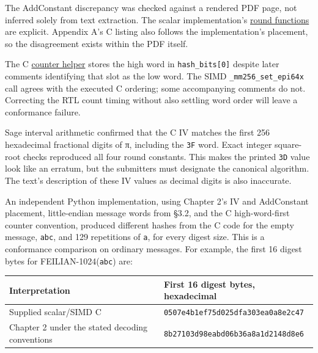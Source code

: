 \documentclass[
  english,
  11pt,
  a4paper,
]{article}
\newcounter{none} %
\begin{document}
The AddConstant discrepancy was checked against a rendered PDF page, not
inferred solely from text extraction. The scalar implementation's
\href{data/SOURCES.md\#source-7}{round functions} are explicit. Appendix
A's C listing also follows the implementation's placement, so the
disagreement exists within the PDF itself.

The C \href{data/SOURCES.md\#source-8}{counter helper} stores the high
word in \texttt{hash\_bits{[}0{]}} despite later comments identifying
that slot as the low word. The SIMD \texttt{\_mm256\_set\_epi64x} call
agrees with the executed C ordering; some accompanying comments do not.
Correcting the RTL count timing without also settling word order will
leave a conformance failure.

Sage interval arithmetic confirmed that the C IV matches the first 256
hexadecimal fractional digits of π, including the \texttt{3F} word.
Exact integer square-root checks reproduced all four round constants.
This makes the printed \texttt{3D} value look like an erratum, but the
submitters must designate the canonical algorithm. The text's
description of these IV values as decimal digits is also inaccurate.

An independent Python implementation, using Chapter 2's IV and
AddConstant placement, little-endian message words from §3.2, and the C
high-word-first counter convention, produced different hashes from the C
code for the empty message, \texttt{abc}, and 129 repetitions of
\texttt{a}, for every digest size. This is a conformance comparison on
ordinary messages. For example, the first 16 digest bytes for
FEILIAN-1024(\texttt{abc}) are:


{\def\LTcaptype{none} %
\begin{longtable}[]{@{}
  >{\raggedright\arraybackslash}p{}
  >{\raggedright\arraybackslash}p{}@{}}
\toprule\noalign{}
\begin{minipage}[b]{\linewidth}\raggedright
Interpretation
\end{minipage} & \begin{minipage}[b]{\linewidth}\raggedright
First 16 digest bytes, hexadecimal
\end{minipage} \\
\midrule\noalign{}
\endhead
\bottomrule\noalign{}
\endlastfoot
Supplied scalar/SIMD C & \nolinkurl{0507e4b1ef75d025dfa303ea0a8e2c47} \\
Chapter 2 under the stated decoding conventions &
\nolinkurl{8b27103d98eabd06b36a8a1d2148d8e6} \\
\end{longtable}
}
\end{document}
